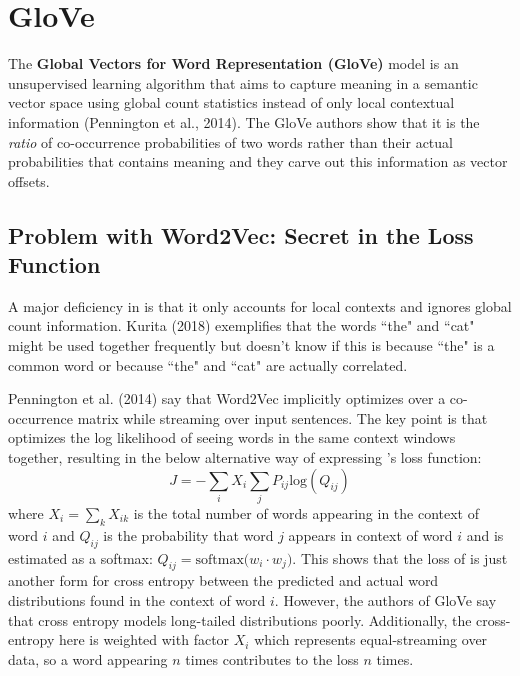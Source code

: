 \section{GloVe} \label{sec:Glove}

The \textbf{Global Vectors for Word Representation (GloVe)} model is an unsupervised learning algorithm that aims to capture meaning in a semantic vector space using global count statistics instead of only local contextual information (Pennington et al., 2014). The GloVe authors show that it is the \emph{ratio} of co-occurrence probabilities of two words rather than their actual probabilities that contains meaning and they carve out this information as vector offsets. 

\subsection{Problem with Word2Vec: Secret in the Loss Function} \label{sec:ProblemWord2VecFromGloveStandpoint}

A major deficiency in  is that it only accounts for local contexts and ignores global count information. Kurita (2018) exemplifies that the words ``the" and ``cat" might be used together frequently but  doesn't know if this is because ``the" is a common word or because ``the" and ``cat" are actually correlated.  

Pennington et al. (2014) say that Word2Vec implicitly optimizes over a co-occurrence matrix while streaming over input sentences. The key point is that  optimizes the log likelihood of seeing words in the same context windows together, resulting in the below alternative way of expressing 's loss function: 
$$
J = - \sum_i X_i \sum_j P_{ij} \text{log}(Q_{ij}) 
$$
where $X_i = \sum_k X_{ik}$ is the total number of words appearing in the context of word $i$ and $Q_{ij}$ is the probability that word $j$ appears in context of word $i$ and is estimated as a softmax: $Q_{ij} = \text{softmax} \Big( w_i \cdot w_j \Big)$. This shows that the loss of  is just another form for cross entropy between the predicted and actual word distributions found in the context of word $i$. However, the authors of GloVe say that cross entropy models long-tailed distributions poorly. Additionally, the cross-entropy here is weighted with factor $X_i$ which represents equal-streaming over data, so a word appearing $n$ times contributes to the loss $n$ times.   

